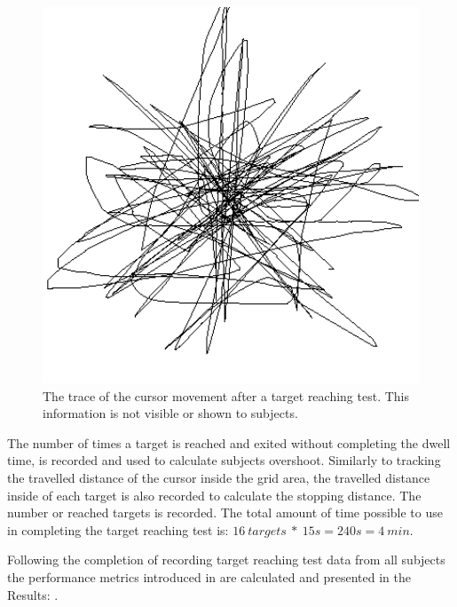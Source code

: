 \begin{figure}[H] 
	\includegraphics[width=1\textwidth]{figures/pMethods/cursorTrace}
	\caption{The trace of the cursor movement after a target reaching test. This information is not visible or shown to subjects.}
	\label{fig:cursorTrace}
\end{figure}

The number of times a target is reached and exited without completing the dwell time, is recorded and used to calculate subjects overshoot. Similarly to tracking the travelled distance of the cursor inside the grid area, the travelled distance inside of each target is also recorded to calculate the stopping distance. The number or reached targets is recorded. The total amount of time possible to use in completing the target reaching test is: $16 ~targets~*~15s = 240s = 4~min$. 

Following the completion of recording target reaching test data from all subjects the performance metrics introduced in  are calculated and presented in the Results: .




